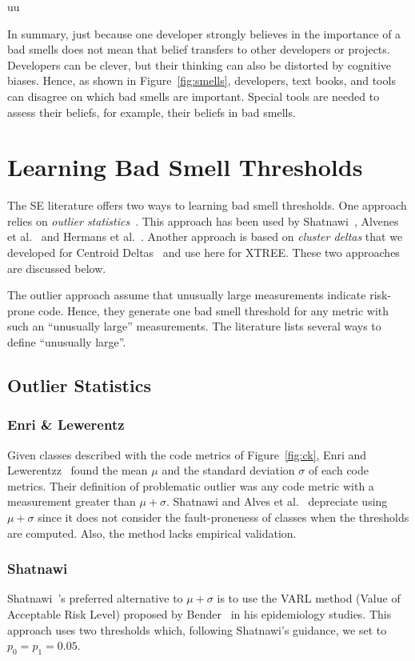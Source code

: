 uu \documentclass[final,twocolumn,5p]{elsarticle}
\newcommand{\fig}[1]{Figure~\ref{fig:#1}}
\theoremstyle{break}
\begin{document}
In summary, just because one developer strongly believes in the importance of a bad smells does not mean that belief transfers to other developers or projects.
Developers can be clever, but their thinking can also be distorted
by cognitive biases.
Hence, as shown in \fig{smells}, developers, text books, and tools 
can disagree on which bad smells are important.
Special tools are needed to assess their beliefs, for example, their beliefs in
bad smells.  
 

\section{Learning Bad Smell Thresholds}\label{sect:bst}


The SE literature offers  two ways to 
learning bad smell thresholds.
One approach relies on 
{\em outlier statistics}~\cite{erni96,bender99}. This approach
has been used   by Shatnawi~\cite{Shatnawi10}, Alvenes et al.~\cite{Alves2010}
    and Hermans et al.~\cite{hermans15}.
    Another approach is 
    based on {\em cluster deltas} that we developed
    for   Centroid Deltas~\cite{me12c} and 
    use here for XTREE. 
    These two approaches are discussed below. 

The outlier approach assume that unusually large measurements indicate risk-prone code.
Hence, they generate one bad smell threshold for any metric
with such an ``unusually large'' measurements. 
The literature lists several ways to define ``unusually large''.

\subsection{Outlier Statistics}

\subsubsection{Enri \& Lewerentz}
Given classes described with the  code metrics of \fig{ck},
Enri and Lewerentzz~\cite{erni96} found the   mean $\mu$ and the standard deviation $\sigma$
of each
code metrics. Their definition of problematic outlier was any code
metric with a measurement greater than $\mu+\sigma$.
Shatnawi and Alves et al.~\cite{Shatnawi10,Alves2010} depreciate
using $\mu+\sigma$ since it does not consider the fault-proneness of classes when the thresholds are computed. Also, the method lacks  empirical validation.

\subsubsection{ Shatnawi}
Shatnawi~\cite{Shatnawi10}'s preferred alternative to $\mu+\sigma$
is to use the VARL method (Value of Acceptable Risk Level) proposed by Bender~\cite{bender99} in his epidemiology studies.  This approach uses two
thresholds which, following Shatnawi's guidance, we set to
$p_0=p_1=0.05$. 
\end{document}
